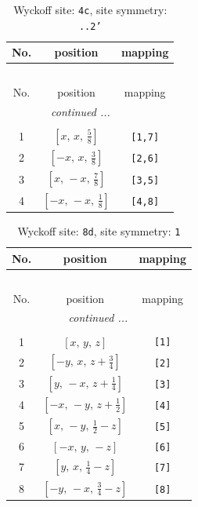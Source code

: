 \documentclass[fleqn,8pt]{jsarticle}
\begin{document}
\renewcommand{\arraystretch}{1.2}
\begin{longtable}{ccc}
\caption{Wyckoff site: {\tt 4c}, site symmetry: {\tt ..2'}}
 \\
 \hline \hline
No. & position & mapping \\ \hline \endfirsthead

\multicolumn{2}{l}{\tablename\ \thetable{}} \\
 \hline \hline
No. & position & mapping \\ \hline \endhead

 \hline \hline
\multicolumn{2}{r}{\footnotesize\it continued ...} \\ \endfoot

 \hline \hline
\multicolumn{2}{r}{} \\ \endlastfoot

1 & $\left[ x,\, x,\, \frac{5}{8} \right]$ & {\tt [1,7]} \\ \hline
2 & $\left[ - x,\, x,\, \frac{3}{8} \right]$ & {\tt [2,6]} \\ \hline
3 & $\left[ x,\, - x,\, \frac{7}{8} \right]$ & {\tt [3,5]} \\ \hline
4 & $\left[ - x,\, - x,\, \frac{1}{8} \right]$ & {\tt [4,8]} \\
\end{longtable}
\renewcommand{\arraystretch}{1.2}
\begin{longtable}{ccc}
\caption{Wyckoff site: {\tt 8d}, site symmetry: {\tt 1}}
 \\
 \hline \hline
No. & position & mapping \\ \hline \endfirsthead

\multicolumn{2}{l}{\tablename\ \thetable{}} \\
 \hline \hline
No. & position & mapping \\ \hline \endhead

 \hline \hline
\multicolumn{2}{r}{\footnotesize\it continued ...} \\ \endfoot

 \hline \hline
\multicolumn{2}{r}{} \\ \endlastfoot

1 & $\left[ x,\, y,\, z \right]$ & {\tt [1]} \\ \hline
2 & $\left[ - y,\, x,\, z + \frac{3}{4} \right]$ & {\tt [2]} \\ \hline
3 & $\left[ y,\, - x,\, z + \frac{1}{4} \right]$ & {\tt [3]} \\ \hline
4 & $\left[ - x,\, - y,\, z + \frac{1}{2} \right]$ & {\tt [4]} \\ \hline
5 & $\left[ x,\, - y,\, \frac{1}{2} - z \right]$ & {\tt [5]} \\ \hline
6 & $\left[ - x,\, y,\, - z \right]$ & {\tt [6]} \\ \hline
7 & $\left[ y,\, x,\, \frac{1}{4} - z \right]$ & {\tt [7]} \\ \hline
8 & $\left[ - y,\, - x,\, \frac{3}{4} - z \right]$ & {\tt [8]} \\
\end{longtable}
\end{document}
